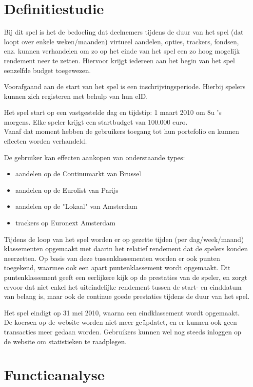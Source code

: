\chapter{Definitiestudie}

Bij dit spel is het de bedoeling dat deelnemers tijdens de duur van het spel (dat loopt over enkele weken/maanden) virtueel aandelen, opties, trackers, fondsen, enz. kunnen verhandelen om zo op het einde van het spel een zo hoog mogelijk rendement neer te zetten. Hiervoor krijgt iedereen aan het begin van het spel eenzelfde budget toegewezen. 

Voorafgaand aan de start van het spel is een inschrijvingsperiode. Hierbij spelers kunnen zich registeren met behulp van hun eID. 

Het spel start op een vastgestelde dag en tijdstip: 1 maart 2010 om 8u 's morgens. Elke speler krijgt een startbudget van 100.000 euro.
\\Vanaf dat moment hebben de gebruikers toegang tot hun portefolio en kunnen effecten worden verhandeld.

De gebruiker kan effecten aankopen van onderstaande types:
\begin{itemize}
  \setlength{\itemsep}{1pt}
  \setlength{\parskip}{0pt}
  \setlength{\parsep}{0pt}
	\item{aandelen op de Continumarkt van Brussel}
	\item{aandelen op de Eurolist van Parijs}
	\item{aandelen op de "Lokaal" van Amsterdam}
	\item{trackers op Euronext Amsterdam}
\end{itemize}

Tijdens de loop van het spel worden er op gezette tijden (per dag/week/maand) klassementen opgemaakt met daarin het relatief rendement dat de spelers konden neerzetten. Op basis van deze tussenklassementen worden er ook punten toegekend, waarmee ook een apart puntenklassement wordt opgemaakt. Dit puntenklassement geeft een eerlijkere kijk op de prestaties van de speler, en zorgt ervoor dat niet enkel het uiteindelijke rendement tussen de start- en einddatum van belang is, maar ook de continue goede prestaties tijdens de duur van het spel.

Het spel eindigt op 31 mei 2010, waarna een eindklassement wordt opgemaakt. De koersen op de website worden niet meer ge\"updatet, en er kunnen ook geen transacties meer gedaan worden. Gebruikers kunnen wel nog steeds inloggen op de website om statistieken te raadplegen.

\chapter{Functieanalyse}

